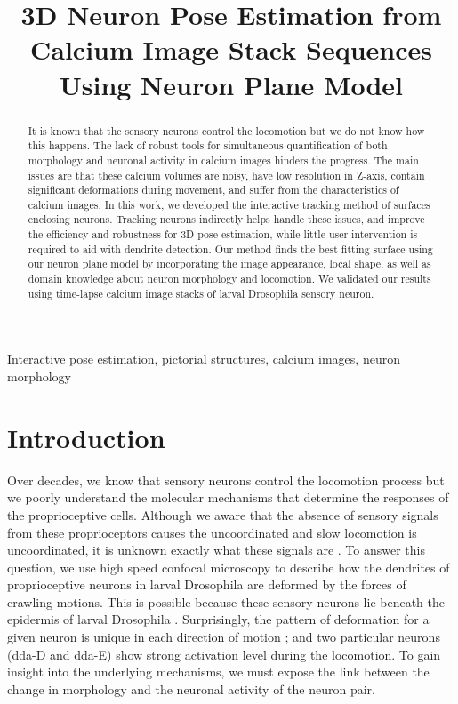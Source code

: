 \documentclass{article}
\title{3D Neuron Pose Estimation from Calcium Image Stack Sequences Using Neuron Plane Model}
\begin{document}
%
\maketitle
%
\begin{abstract}
It is known that the sensory neurons control the locomotion but we do not know how this happens. The lack of robust tools for simultaneous quantification of both morphology and neuronal activity in calcium images hinders the progress. The main issues are that these calcium volumes are noisy, have low resolution in Z-axis, contain significant deformations during movement, and suffer from the characteristics of calcium images. In this work, we developed the interactive tracking method of surfaces enclosing neurons. Tracking neurons indirectly helps handle these issues, and improve the efficiency and robustness for 3D pose estimation, while little user intervention is required to aid with dendrite detection. Our method finds the best fitting surface using our neuron plane model by incorporating the image appearance, local shape, as well as domain knowledge about neuron morphology and locomotion. We validated our results using time-lapse calcium image stacks of larval Drosophila sensory neuron.
\end{abstract}
%
\begin{keywords}
Interactive pose estimation, pictorial structures, calcium images, neuron morphology
\end{keywords}
%
\section{Introduction}
\label{sec:intro}
Over decades, we know that sensory neurons control the locomotion process but we poorly understand the molecular mechanisms that determine the responses of the proprioceptive cells. Although we aware that the absence of sensory signals from these proprioceptors causes the uncoordinated and slow locomotion is uncoordinated, it is unknown exactly what these signals are \cite{Hughes2007}. To answer this question, we use high speed confocal microscopy to describe how the dendrites of proprioceptive neurons in larval Drosophila are deformed by the forces of crawling motions. This is possible because these sensory neurons lie beneath the epidermis of larval Drosophila \cite{Grueber2002}. Surprisingly, the pattern of deformation for a given neuron is unique in each direction of motion \cite{Gulyanon2018a}; and two particular neurons (dda-D and dda-E) show strong activation level during the locomotion. To gain insight into the underlying mechanisms, we must expose the link between the change in morphology and the neuronal activity of the neuron pair.
\end{document}
